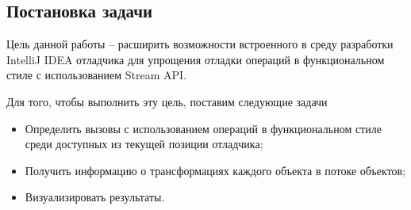 \subsection{Постановка задачи}
Цель данной работы -- расширить возможности встроенного в среду разработки IntelliJ IDEA отладчика для упрощения отладки операций в функциональном стиле с использованием Stream API.

Для того, чтобы выполнить эту цель, поставим следующие задачи
\begin{itemize}
	\item Определить вызовы с использованием операций в функциональном стиле среди доступных из текущей позиции отладчика;
	\item Получить информацию о трансформациях каждого объекта в потоке объектов;
	\item Визуализировать результаты.
\end{itemize}
